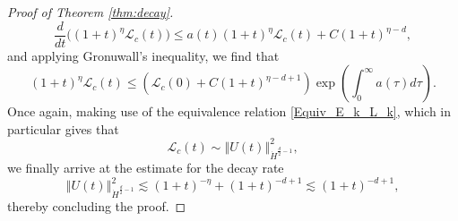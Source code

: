 \documentclass[11pt, leqno, a4paper,]{amsart}
\theoremstyle{remark}
\numberwithin{equation}{section}
\newcommand*{\norm}[1]{\left\Vert #1\right\Vert}
\begin{document}
\begin{proof}[Proof of Theorem \ref{thm:decay}]
\begin{equation*}
	\frac{d}{dt}\Big ( (1+t)^\eta \mathcal{L}_c(t)\Big ) \leq a(t) (1+t)^\eta \mathcal{L}_c(t)  +C \left( 1+t \right) ^ {\eta  -d   },
\end{equation*}
and applying Gronuwall's inequality, we find that 
\begin{equation*}
	(1+t)^\eta \mathcal{L}_c(t) \leq  \left(  \mathcal{L}_c(0)   + C (1+t)^ {\eta - d+1} 
	\right) \exp \left ( \int_{0}^\infty a(\tau) d\tau  \right).
\end{equation*} 
Once again, making use of  the equivalence relation \eqref{Equiv_E_k_L_k}, which in particular gives that 
\begin{equation*}
	\mathcal{L}_c(t) \sim \norm {U(t)}_{\dot H^{\frac{d}{2}-1}}^2,
\end{equation*}
we finally arrive at the  estimate for the decay rate   
\begin{equation*}
	  \norm {U(t)}_{\dot H^ {\frac{d}{2}-1}}^2  \lesssim   (1+t)^ {-\eta } +  (1+t)^ {-d +1 } \lesssim  (1+t)^ {-d +1 },
\end{equation*} 
thereby concluding the proof. 
   \end{proof}



\appendix
  
    	 
\end{document}
